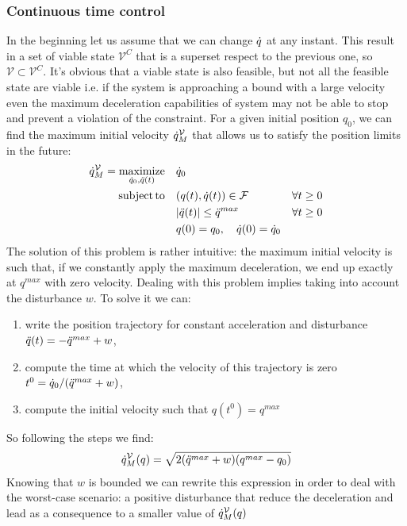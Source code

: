 \documentclass{article}
\begin{document}
\subsubsection*{Continuous time control}
In the beginning let us assume that we can change $\dot{q}$ at any instant. This result in a set of viable state $\mathcal{V}^C$ that is a superset respect to the previous one, so $\mathcal{V} \subset \mathcal{V}^C$. It's obvious that a viable state is also feasible, but not all the feasible state are viable i.e. if the system is approaching a bound with a large velocity even the maximum deceleration capabilities of system may not be able to stop and prevent a violation of the constraint. For a given initial position $q_0$, we can find the maximum initial velocity $\dot{q}^{\mathcal{V}}_M$ that allows us to satisfy the position limits in the future:
\begin{equation} \begin{aligned} 
\dot{q}^{\mathcal{V}}_M = \operatorname*{maximize}_{\dot{q}_0, \ddot{q}(t)} \quad & \dot{q}_0 & \\
\operatorname*{subject\,to} \quad 
& (q(t), \dot{q}(t)) \in \mathcal{F}           & \forall t \ge 0 \\
& |\ddot{q}(t)| \le \ddot{q}^{max}        & \forall t \ge 0 \\
& q(0) = q_0, \quad \dot{q}(0) = \dot{q}_0  &
\end{aligned} \end{equation}
The solution of this problem is rather intuitive: the maximum initial velocity is such that, if we constantly apply the maximum deceleration, we end up exactly at $q^{max}$ with zero velocity.
Dealing with this problem implies taking into account the disturbance $w$. To solve it we can:
\begin{enumerate}
    \item write the position trajectory for constant acceleration and disturbance \mbox{$\ddot{q}(t) =-\ddot{q}^{max}+w$}, 
    \item compute the time at which the velocity of this trajectory is zero \mbox{$t^{0} = \dot{q}_0 /( \ddot{q}^{max}+w)$}, 
    \item compute the initial velocity such that $q(t^{0}) = q^{max}$
\end{enumerate}
So following the steps we find:
\begin{equation} \begin{aligned} 
    \dot{q}^{\mathcal{V}}_M(q) = \sqrt{2 (\ddot{q}^{max}+w) (q^{max} - q_0)}
    \end{aligned} 
\end{equation}
Knowing that $w$ is bounded we can rewrite this expression in order to deal with the worst-case scenario: a positive disturbance that reduce the deceleration and lead as a consequence to a smaller value of $\dot{q}^{\mathcal{V}}_M(q)$
\end{document}
